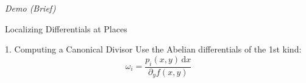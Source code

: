 \documentclass{beamer}
\newcommand{\dx}{\,\mathrm{d}x}
\begin{document}
\begin{frame}
  \vspace{32pt}
  \begin{center}
    {\Huge \it Demo (Brief)}

    \vspace{24pt}

    Localizing Differentials at Places
  \end{center}
\end{frame}


\begin{frame}{1. Computing a Canonical Divisor}{}
  Use the Abelian differentials of the 1st kind:
  \[
  \omega_i = \frac{p_i(x,y) \dx}{\partial_y f(x,y)}
  \]
\end{frame}


\end{document}
